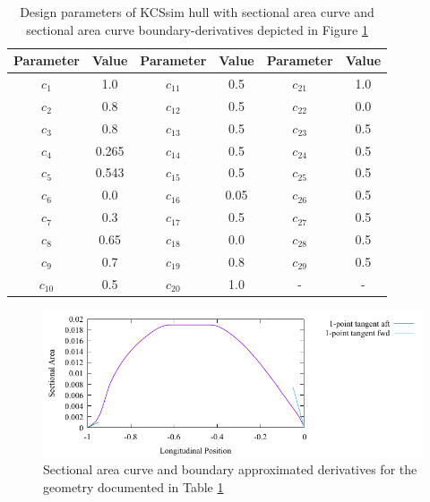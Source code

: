 \documentclass{report}
\begin{document}
\begin{table}[H]
    \centering
    \begin{tabular}{|c|c|c|c|c|c|}
        \hline 
        Parameter & Value & Parameter & Value & Parameter & Value\\
        \hline 
        $c_1$ & 1.0 & $c_{11}$ & 0.5 & $c_{21}$ & 1.0 \\
        \hline 
        $c_2$ & 0.8 & $c_{12}$ & 0.5 & $c_{22}$ & 0.0\\
        \hline 
        $c_3$ & 0.8 & $c_{13}$ & 0.5 & $c_{23}$ & 0.5 \\
        \hline 
        $c_4$ & 0.265 & $c_{14}$ & 0.5 & $c_{24}$ & 0.5 \\
        \hline 
        $c_5$ & 0.543 & $c_{15}$ & 0.5 & $c_{25}$ & 0.5 \\
        \hline 
        $c_6$ & 0.0 & $c_{16}$ & 0.05 & $c_{26}$ & 0.5 \\
        \hline 
        $c_7$ & 0.3 & $c_{17}$ & 0.5 & $c_{27}$ & 0.5 \\
        \hline 
        $c_8$ & 0.65 & $c_{18}$ & {\color{blue} 0.0} & $c_{28}$ & 0.5 \\
        \hline 
        $c_9$ & 0.7 & $c_{19}$ & 0.8 & $c_{29}$ & 0.5 \\
        \hline 
        $c_{10}$ & 0.5 & $c_{20}$ & 1.0 & - & - \\
        \hline 
    \end{tabular}
    \caption{Design parameters of KCSsim hull with sectional area curve and 
    sectional area curve boundary-derivatives depicted in Figure
    \ref{fig:test-4-sac-3}}
    \label{tab:test-4-3}
\end{table}
\begin{figure}[H]
    \centering
    \includegraphics[width = 0.7\linewidth]{figures/test-4-sac-3.pdf}
    \caption{Sectional area curve and boundary approximated derivatives for
    the geometry documented in Table \ref{tab:test-4-3}}
    \label{fig:test-4-sac-3}
\end{figure}
\end{document}
